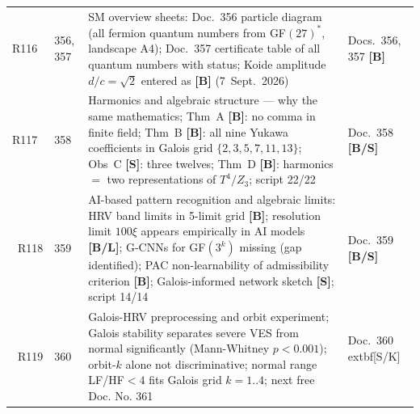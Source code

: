 \begin{longtable}{@{}p{1.2cm}p{3.4cm}p{5.8cm}p{3.4cm}@{}}
R116 & 356, 357 & SM overview sheets: Doc.~356 particle diagram (all fermion quantum numbers from GF$(27)^*$, landscape A4); Doc.~357 certificate table of all quantum numbers with status; Koide amplitude $d/c=\sqrt{2}$ entered as \textbf{[B]} (7~Sept.~2026) & Docs.~356, 357 \textbf{[B]} \\
R117 & 358 & Harmonics and algebraic structure --- why the same mathematics; Thm~A \textbf{[B]}: no comma in finite field; Thm~B \textbf{[B]}: all nine Yukawa coefficients in Galois grid $\{2,3,5,7,11,13\}$; Obs~C \textbf{[S]}: three twelves; Thm~D \textbf{[B]}: harmonics $=$ two representations of $T^4/Z_3$; script 22/22 & Doc.~358 \textbf{[B/S]} \\\
R118 & 359 & AI-based pattern recognition and algebraic limits: HRV band limits in 5-limit grid \textbf{[B]}; resolution limit $100\xi$ appears empirically in AI models \textbf{[B/L]}; G-CNNs for GF$(3^k)$ missing (gap identified); PAC non-learnability of admissibility criterion \textbf{[B]}; Galois-informed network sketch \textbf{[S]}; script 14/14 & Doc.~359 \textbf{[B/S]} \\\
R119 & 360 & Galois-HRV preprocessing and orbit experiment; Galois stability separates severe VES from normal significantly (Mann-Whitney $p<0.001$); orbit-$k$ alone not discriminative; normal range LF/HF$<4$ fits Galois grid $k=1..4$; next free Doc. No. 361 & Doc.~360 	extbf{[S/K]} \
\end{longtable}
\endgroup







